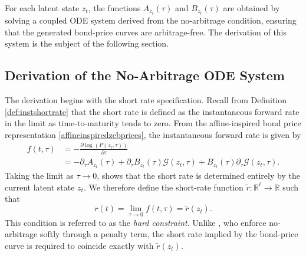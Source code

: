 

For each latent state $z_t$, the functions $A_{z_t}(\tau)$ and $B_{z_t}(\tau)$ are obtained by solving a coupled ODE system derived from the no-arbitrage condition, ensuring that the generated bond-price curves are arbitrage-free. The derivation of this system is the subject of the following section.


\subsection{Derivation of the No-Arbitrage ODE System}
\label{subsec:no_arbitrage_ode_system}

The derivation begins with the short rate specification. Recall from Definition \ref{def:instshortrate} that the short rate is defined as the instantaneous forward rate in the limit as time-to-maturity tends to zero. From the affine-inspired bond price representation \eqref{affineinspiredzcbprices}, the instantaneous forward rate is given by
\begin{align}
f(t,\tau)
&= -\frac{\partial \log(P(z_t,\tau))}{\partial \tau} \nonumber\\
&= -\partial_{\tau}A_{z_t}(\tau)
+ \partial_{\tau}B_{z_t}(\tau)\mathcal{G}(z_t,\tau)
+ B_{z_t}(\tau)\partial_{\tau}\mathcal{G}(z_t,\tau).
\label{eq:instantforwardrate}
\end{align}
Taking the limit as $\tau \to 0$, shows that the short rate is determined entirely by the current latent state $z_t$. We therefore define the short-rate function $\tilde r:\mathbb{R}^\ell\to\mathbb{R}$ such that
\begin{equation}
    r(t)=\lim_{\tau\to0}f(t,\tau)=\tilde r(z_t).
    \label{hardconstraint}
\end{equation}
This condition is referred to as the \textit{hard constraint}. Unlike \citet{Andreasen2023}, who enforce no-arbitrage softly through a penalty term, the short rate implied by the bond-price curve is required to coincide exactly with $\tilde r(z_t)$.

